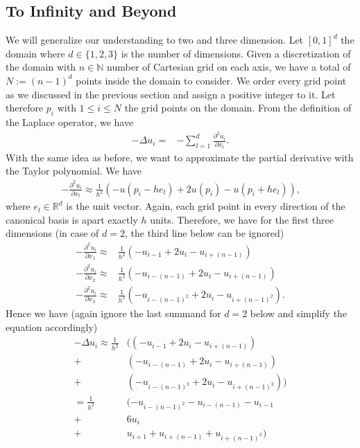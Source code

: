\subsection{To Infinity and Beyond}

We will generalize our understanding to two and three dimension. Let \([0, 1]^d\) the domain where \(d \in \{1, 2, 3\} \) is the number of dimensions. Given a discretization of the domain with \(n \in \mathbb{N}\) number of Cartesian grid on each axis, we have a total of \(N := (n-1)^d\) points inside the domain to consider. We order every grid point as we discussed in the previous section and assign a positive integer to it. Let therefore \(p_i\) with \(1 \leq i \leq N\) the grid points on the domain. From the definition of the Laplace operator, we have
\begin{align*}
	-\Delta u_i =& -\sum^d_{l=1}\frac{\partial^2 u_i}{\partial x_l} \text{.}
\end{align*}
With the same idea as before, we want to approximate the partial derivative with the Taylor polynomial. We have
\begin{align*}
	-\frac{\partial^2 u_i}{\partial x_l} \approx \frac{1}{h^2}
	(-u(p_i - h e_l) + 2u(p_i) -u(p_i + h e_l)) \text{,}
\end{align*}
where \(e_l \in \mathbb{R}^{d}\) is the unit vector. Again, each grid point in every direction of the canonical basis is apart exactly \(h\) units. Therefore, we have for the first three dimensions (in case of \(d=2\), the third line below can be ignored)
\begin{align*}
	-\frac{\partial^2 u_i}{\partial x_1} \approx& \frac{1}{h^2}
	(-u_{i - 1} + 2u_i -u_{i + (n - 1)}) \\
	-\frac{\partial^2 u_i}{\partial x_2} \approx& \frac{1}{h^2}
	(-u_{i - (n - 1)} + 2u_i -u_{i + (n - 1)}) \\
	-\frac{\partial^2 u_i}{\partial x_3} \approx& \frac{1}{h^2}
	(-u_{i - (n - 1)^2} + 2u_i -u_{i + (n - 1)^2}) \text{.}
\end{align*}
Hence we have (again ignore the last summand for \(d=2\) below and simplify the equation accordingly)
\begin{align*}
	-\Delta u_i \approx \frac{1}{h^2} & ( (-u_{i - 1} + 2u_i -u_{i + (n - 1)} ) \\
	+&(-u_{i - (n - 1)} + 2u_i -u_{i + (n - 1)}) \\
	+&(-u_{i - (n - 1)^2} + 2u_i -u_{i + (n - 1)^2}) ) \\
	= \frac{1}{h^2} & 
	( -u_{i - (n - 1)^2} -u_{i - (n - 1)} -u_{i - 1} \\
	+& 6u_i \\
	+& u_{i + 1} + u_{i + (n - 1)} + u_{i + (n-1)^2} )
\end{align*}
